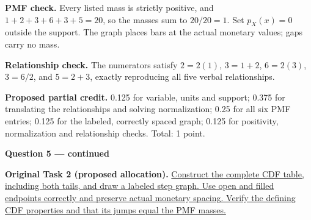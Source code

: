 \begin{center}\end{center}

\textbf{PMF check.} Every listed mass is strictly positive, and $1+2+3+6+3+5=20$, so the masses sum to $20/20=1$. Set $p_X(x)=0$ outside the support. The graph places bars at the actual monetary values; gaps carry no mass.

\textbf{Relationship check.} The numerators satisfy $2=2(1)$, $3=1+2$, $6=2(3)$, $3=6/2$, and $5=2+3$, exactly reproducing all five verbal relationships.

\textbf{Proposed partial credit.} 0.125 for variable, units and support; 0.375 for translating the relationships and solving normalization; 0.25 for all six PMF entries; 0.125 for the labeled, correctly spaced graph; 0.125 for positivity, normalization and relationship checks. Total: 1 point.

\par\vspace{3mm}\secInicio[][sec:q5]

\clearpage
\textbf{Question 5 --- continued}

\textbf{Original Task 2 (proposed allocation).} \hyperref[sol:q5t2]{Construct the complete CDF table, including both tails, and draw a labeled step graph. Use open and filled endpoints correctly and preserve actual monetary spacing. Verify the defining CDF properties and that its jumps equal the PMF masses.} 


